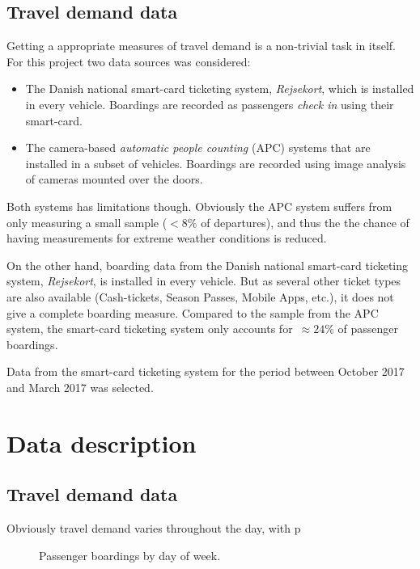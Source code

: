 \documentclass[a4paper,11pt]{article}
\begin{document}
\subsection{Travel demand data}\label{ch:data_traveldemand}
Getting a appropriate measures of travel demand is a non-trivial task in itself. For this project two data sources was considered:
\begin{itemize}
	\item The Danish national smart-card ticketing system, \emph{Rejsekort}, which is installed in every vehicle. Boardings are recorded as passengers \emph{check in} using their smart-card.
	\item The camera-based \emph{automatic people counting} (APC) systems that are installed in a subset of vehicles. Boardings are recorded using image analysis of cameras mounted over the doors.
\end{itemize}

Both systems has limitations though. Obviously the APC system suffers from only measuring a small sample ($<8\%$ of departures), and thus the the chance of having measurements for extreme weather conditions is reduced.

On the other hand, boarding data from the Danish national smart-card ticketing system, \emph{Rejsekort}, is installed in every vehicle. But as several other ticket types are also available (Cash-tickets, Season Passes, Mobile Apps, etc.), it does not give a complete boarding measure. Compared to the sample from the APC system, the smart-card ticketing system only accounts for~$\approx 24\%$ of passenger boardings.


Data from the smart-card ticketing system for the period between October 2017 and March 2017 was selected.

\section{Data description}\label{ch:desc}

\subsection{Travel demand data}\label{ch:desc_traveldemand}

Obviously travel demand varies throughout the day, with p
\begin{figure}[!ht]
	\center
	
	\caption{Passenger boardings by day of week.}
\end{figure}
\end{document}
